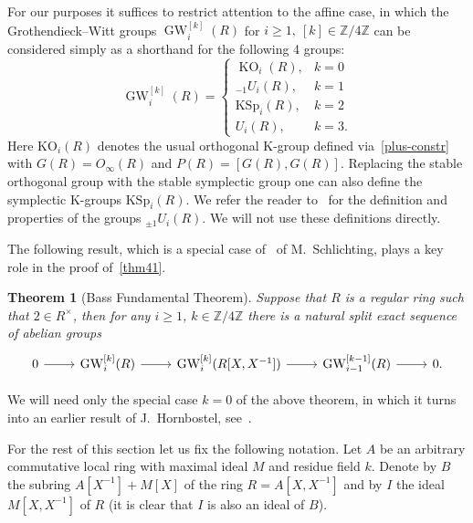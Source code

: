 \documentclass[oneside, 8pt]{amsart}
\newtheorem{externaltheorem}[lemma]{Theorem}
\theoremstyle{remark}
\theoremstyle{definition}
\numberwithin{lemma}{section}
\numberwithin{prop}{section}
\numberwithin{corollary}{section}
\numberwithin{externaltheorem}{section}
\DeclareMathOperator{\KO}{KO}
\DeclareMathOperator{\GW}{GW}
\newcommand{\ZZ}{\mathbb{Z}}
\numberwithin{equation}{section}
\begin{document}
For our purposes it suffices to restrict attention to the affine case, in which  the Grothendieck--Witt groups $\GW_i^{[k]}(R)$ for $i \geq 1,\ [k] \in \ZZ/4\ZZ$ can be considered simply as a shorthand for the following 4 groups:
\begin{equation} \label{GW-concrete} \GW_i^{[k]}(R) = \left\{\begin{array}{ll} \KO_i(R), & k = 0 \\ {}_{-1}\!U_i(R), & k = 1 \\ \mathrm{KSp}_i(R), & k = 2 \\ U_i(R), & k = 3. \end{array}\right. \end{equation}
Here $\mathrm{KO}_i(R)$ denotes the usual orthogonal K-group defined via~\eqref{plus-constr} with $G(R) = O_\infty(R)$ and $P(R) = [G(R), G(R)]$.
Replacing the stable orthogonal group with the stable symplectic group one can also define the symplectic K-groups $\mathrm{KSp}_i(R)$.
We refer the reader to~\cite{Ka80} for the definition and properties of the groups ${}_{\pm 1}\!U_i(R)$. We will not use these definitions directly.

The following result, which is a special case of~\cite[Theorem~9.13]{Sch16} of M.~Schlichting, plays a key role in the proof of~\cref{thm41}.
\begin{externaltheorem}[Bass Fundamental Theorem]\label{bass-ft} Suppose that $R$ is a regular ring such that $2 \in R^\times$, 
then for any $i\geq 1$, $k\in \ZZ/4\ZZ$ there is a natural split exact sequence of abelian groups 
\[ \begin{tikzcd} 0 \arrow{r} & \GW_i^{[k]}(R) \arrow{r} & \GW_i^{[k]}(R[X, X^{-1}]) \arrow{r} & \GW_{i-1}^{[k-1]}(R) \arrow{r} & 0. \end{tikzcd} \] \end{externaltheorem}
We will need only the special case $k=0$ of the above theorem, in which it turns into an earlier result of J.~Hornbostel, see~\cite[Corollary~5.3]{Ho05}.

For the rest of this section let us fix the following notation.
Let $A$ be an arbitrary commutative local ring with maximal ideal $M$ and residue field $k$.
Denote by $B$ the subring $A[X^{-1}] + M[X]$ of the ring $R = A[X, X^{-1}]$ and
by $I$ the ideal $M[X, X^{-1}]$ of $R$ (it is clear that $I$ is also an ideal of $B$).
\end{document}
